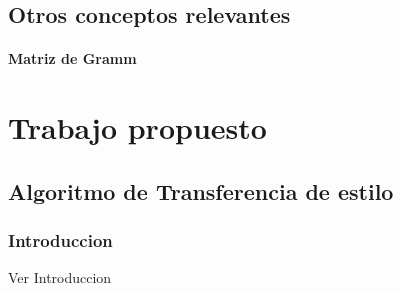 \documentclass[a4paper,12pt,spanish]{book}
\begin{document}
     \section {Otros conceptos relevantes}
	\subsubsection{Matriz de Gramm}
     
     
\chapter{Trabajo propuesto}
  \section{Algoritmo de Transferencia de estilo}
    \subsection{Introduccion}
    Ver Introduccion 
\end{document}
